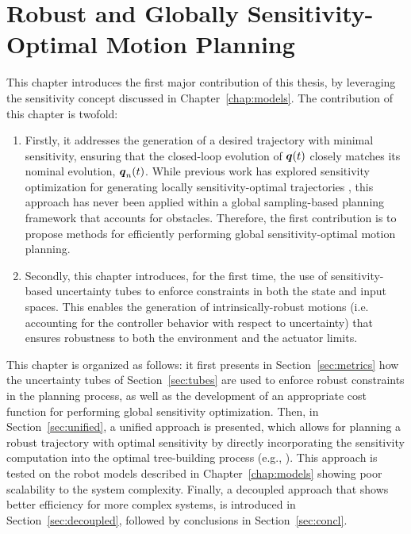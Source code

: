 \chapter{Robust and Globally Sensitivity-Optimal Motion Planning}\label{chap:samp}

This chapter introduces the first major contribution of this thesis, by leveraging the sensitivity concept discussed in Chapter~\ref{chap:models}.
The contribution of this chapter is twofold:
\begin{enumerate}
    \item Firstly, it addresses the generation of a desired trajectory with minimal sensitivity, ensuring that the closed-loop evolution of $\boldsymbol{q}(t)$ closely matches its nominal evolution, $\boldsymbol{q}_n(t)$. 
    While previous work has explored sensitivity optimization for generating locally sensitivity-optimal trajectories \cite{cPi, cTh}, this approach has never been applied within a global sampling-based planning framework that accounts for obstacles. 
    Therefore, the first contribution is to propose methods for efficiently performing global sensitivity-optimal motion planning.
    \item Secondly, this chapter introduces, for the first time, the use of sensitivity-based uncertainty tubes to enforce constraints in both the state and input spaces. 
    This enables the generation of intrinsically-robust motions (i.e. accounting for the controller behavior with respect to uncertainty) that ensures robustness to both the environment and the actuator limits.
\end{enumerate}
This chapter is organized as follows: it first presents in Section~\ref{sec:metrics} how the uncertainty tubes of Section~\ref{sec:tubes} are used to enforce robust constraints in the planning process, as well as the development of an appropriate cost function for performing global sensitivity optimization.
Then, in Section~\ref{sec:unified}, a unified approach is presented, which allows for planning a robust trajectory with optimal sensitivity by directly incorporating the sensitivity computation into the optimal tree-building process (e.g., ). 
This approach is tested on the robot models described in Chapter~\ref{chap:models} showing poor scalability to the system complexity.
Finally, a decoupled approach that shows better efficiency for more complex systems, is introduced in Section~\ref{sec:decoupled}, followed by conclusions in Section~\ref{sec:concl}.

